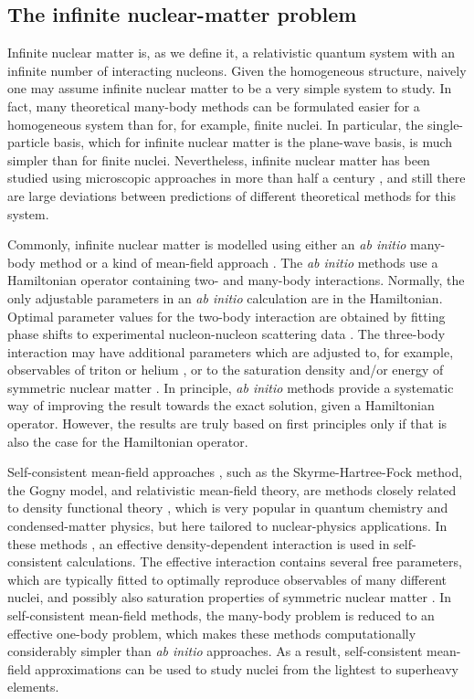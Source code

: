 \documentclass[a4paper,12pt]{report}
\begin{document}
\subsection{The infinite nuclear-matter problem} \label{sec:inf}

Infinite nuclear matter is, as we define it, a relativistic 
quantum system with an infinite number of interacting nucleons. 
Given the homogeneous structure, naively one may assume infinite
nuclear matter to be a very simple system to study. In fact, 
many theoretical many-body methods can be formulated easier for 
a homogeneous system than for, for example, finite nuclei. 
In particular, the single-particle basis, which for infinite 
nuclear matter is the plane-wave basis, is much simpler 
than for finite nuclei. Nevertheless, infinite
nuclear matter has been studied using microscopic approaches 
in more than half a century \cite{brueckner1954,brueckner_gammel}, 
and still there are large deviations \cite{fuchs2004,stone_2007} 
between predictions of different theoretical methods for this 
system.

Commonly, infinite nuclear matter is modelled using either an
\emph{ab initio} many-body method \cite{muther2000,fuchs2004} 
or a kind of mean-field approach \cite{bender2003,dalen2010}. 
The \emph{ab initio} methods use a Hamiltonian operator 
containing two- and many-body interactions. Normally,
the only adjustable parameters in an \emph{ab initio} calculation
are in the Hamiltonian. Optimal parameter values for the two-body 
interaction are obtained by fitting phase shifts to 
experimental nucleon-nucleon scattering data \cite{machleidt2001}.
The three-body interaction may have additional parameters which
are adjusted to, for example, observables of triton or helium
\cite{machleidt2011}, or to the saturation density and/or energy
of symmetric nuclear matter \cite{akmal1998,lejeune2000,soma2008,
gandolfi_2010}. In principle, \emph{ab initio} methods provide 
a systematic way of improving the result towards the exact 
solution, given a Hamiltonian operator. However, the results
are truly based on first principles only if that is also the case 
for the Hamiltonian operator. 

Self-consistent mean-field approaches  \cite{bender2003}, such 
as the Skyrme-Hartree-Fock method, the Gogny model, and 
relativistic mean-field theory, are methods closely related to 
density functional theory \cite{gross1995}, which is very
popular in quantum chemistry and condensed-matter physics, but 
here tailored to nuclear-physics applications.
In these methods \cite{bender2003}, an effective 
density-dependent interaction is 
used in self-consistent calculations. The effective interaction 
contains several free parameters, which are typically fitted to 
optimally reproduce observables of many different nuclei, and 
possibly also saturation properties of symmetric nuclear 
matter \cite{stone_2007}. In self-consistent mean-field
methods, the many-body problem is reduced to an effective
one-body problem, which makes these methods computationally
considerably simpler than \emph{ab initio} approaches. As a 
result, self-consistent mean-field approximations can be used
to study nuclei from the lightest to superheavy elements. 
\end{document}
